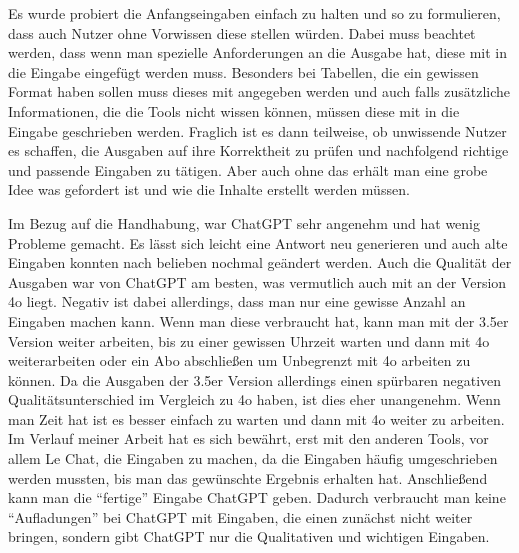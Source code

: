 Es wurde probiert die Anfangseingaben einfach zu halten und so zu formulieren, dass auch Nutzer ohne Vorwissen 
diese stellen würden. Dabei muss beachtet werden, dass wenn man spezielle Anforderungen an die Ausgabe hat, 
diese mit in die Eingabe eingefügt werden muss. Besonders bei Tabellen, die ein gewissen Format haben sollen 
muss dieses mit angegeben werden und auch falls zusätzliche Informationen, die die Tools nicht wissen können,
müssen diese mit in die Eingabe geschrieben werden. Fraglich ist es dann teilweise, ob unwissende Nutzer es 
schaffen, die Ausgaben auf ihre Korrektheit zu prüfen und nachfolgend richtige und passende Eingaben zu tätigen.
Aber auch ohne das erhält man eine grobe Idee was gefordert ist und wie die Inhalte erstellt werden müssen. 

Im Bezug auf die Handhabung, war ChatGPT sehr angenehm und hat wenig Probleme gemacht. Es lässt sich leicht 
eine Antwort neu generieren und auch alte Eingaben konnten nach belieben nochmal geändert werden. Auch die 
Qualität der Ausgaben war von ChatGPT am besten, was vermutlich auch mit an der Version 4o liegt. Negativ ist 
dabei allerdings, dass man nur eine gewisse Anzahl an Eingaben machen kann. Wenn man diese verbraucht hat, kann 
man mit der 3.5er Version weiter arbeiten, bis zu einer gewissen Uhrzeit warten und dann mit 4o weiterarbeiten oder 
ein Abo abschließen um Unbegrenzt mit 4o arbeiten zu können. Da die Ausgaben der 3.5er Version allerdings einen spürbaren 
negativen Qualitätsunterschied im Vergleich zu 4o haben, ist dies eher unangenehm. Wenn man Zeit hat ist es besser 
einfach zu warten und dann mit 4o weiter zu arbeiten. Im Verlauf meiner Arbeit hat es sich bewährt, erst mit 
den anderen Tools, vor allem Le Chat, die Eingaben zu machen, da die Eingaben häufig umgeschrieben werden mussten, bis man
das gewünschte Ergebnis erhalten hat. Anschließend kann man die ``fertige'' Eingabe ChatGPT geben. Dadurch verbraucht man 
keine ``Aufladungen'' bei ChatGPT mit Eingaben, die einen zunächst nicht weiter bringen, sondern gibt ChatGPT nur die 
Qualitativen und wichtigen Eingaben.

